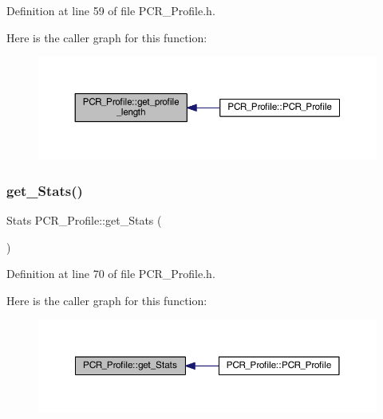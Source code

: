 Definition at line 59 of file P\+C\+R\+\_\+\+Profile.\+h.

Here is the caller graph for this function\+:
\nopagebreak
\begin{figure}[H]
\begin{center}
\leavevmode
\includegraphics[width=350pt]{class_p_c_r___profile_ad25903940b769ad48abaf472175e5ccf_icgraph}
\end{center}
\end{figure}
\mbox{\label{class_p_c_r___profile_a05e64bbe69413cb969b31ffae46e6a10}} 
\subsubsection{\texorpdfstring{get\+\_\+\+Stats()}{get\_Stats()}}
{\footnotesize\ttfamily Stats P\+C\+R\+\_\+\+Profile\+::get\+\_\+\+Stats (\begin{DoxyParamCaption}{ }\end{DoxyParamCaption})\hspace{0.3cm}{\ttfamily [inline]}}



Definition at line 70 of file P\+C\+R\+\_\+\+Profile.\+h.

Here is the caller graph for this function\+:
\nopagebreak
\begin{figure}[H]
\begin{center}
\leavevmode
\includegraphics[width=350pt]{class_p_c_r___profile_a05e64bbe69413cb969b31ffae46e6a10_icgraph}
\end{center}
\end{figure}
\mbox{\label{class_p_c_r___profile_adf41a697d05489582745d650d4e7c956}} 
